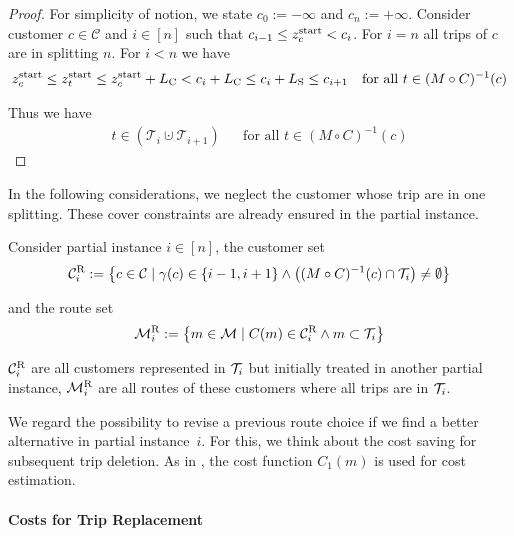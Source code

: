 \begin{proof}

For simplicity of notion, we state $c_0:=-\infty$ and $c_n:=+\infty$. Consider customer $c\in\mathcal{C}$ and $i\in[n]$ such that ${c_{i-1} \leq z^{\operatorname{start}}_c < c_i}$. For $i=n$ all trips of $c$ are in splitting $n$.	 For $i<n$ we have
\begin{align*}
	z^{\operatorname{start}}_c \leq z^{\operatorname{start}}_t \leq z^{\operatorname{start}}_c + L_{\operatorname{C}} < c_i + L_{\operatorname{C}} \leq c_i + L_{\operatorname{S}} \leq c_{i+1} && \text{for all } t\in (M\circ C)^{-1}(c)
\end{align*}

Thus we have
\begin{align*}
	t\in\left(\mathcal{T}_i\cupdot\mathcal{T}_{i+1}\right) && \text{for all } t\in (M\circ C)^{-1}(c)
\end{align*}

\end{proof}

In the following considerations, we neglect the customer whose trip are in one splitting. These cover constraints are already ensured in the partial instance.

Consider partial instance $i\in[n]$, the customer set
\begin{align*}
	\mathcal{C}^{\operatorname{R}}_i := \left\{c\in\mathcal{C}\mid\gamma(c)\in\left\{i-1,i+1\right\}\land\left((M\circ C)^{-1}(c)\cap\mathcal{T}_i\right)\neq\emptyset\right\}
\end{align*}

and the route set
\begin{align*}
	\mathcal{M}^{\operatorname{R}}_i := \left\{m\in\mathcal{M}\mid C(m)\in\mathcal{C}^{\operatorname{R}}_i\land m\subset\mathcal{T}_i\right\}
\end{align*}

$\mathcal{C}^{\operatorname{R}}_i$ are all customers represented in $\mathcal{T}_i$ but initially treated in another partial instance, $\mathcal{M}^{\operatorname{R}}_i$ are all routes of these customers where all trips are in $\mathcal{T}_i$.

We regard the possibility to revise a previous route choice if we find a better alternative in partial instance~$i$. For this, we think about the cost saving for subsequent trip deletion. As in , the cost function $C_1(m)$ is used for cost estimation.

\paragraph{Costs for Trip Replacement} \parfill

